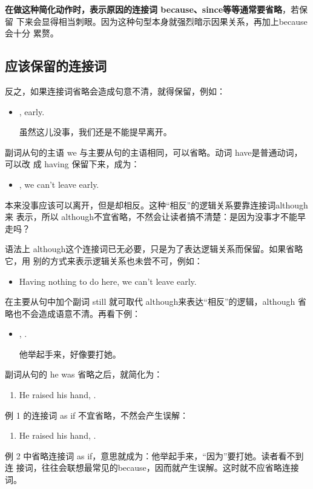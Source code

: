 \textbf{在做这种简化动作时，表示原因的连接词 because、since等等通常要省略}，若保留
下来会显得相当刺眼。因为这种句型本身就强烈暗示因果关系，再加上because 会十分
累赘。

\subsection{应该保留的连接词}

反之，如果连接词省略会造成句意不清，就得保留，例如：
\begin{itemize}
\item {},   early.

  虽然这儿没事，我们还是不能提早离开。
\end{itemize}
副词从句的主语 we 与主要从句的主语相同，可以省略。动词 have是普通动词，可以改
成 having 保留下来，成为：
\begin{itemize}
\item {}, we can't leave early.
\end{itemize}
本来没事应该可以离开，但是却相反。这种“相反”的逻辑关系要靠连接词although 来
表示，所以 although不宜省略，不然会让读者搞不清楚：是因为没事才不能早走吗？

语法上 although这个连接词已无必要，只是为了表达逻辑关系而保留。如果省略它，用
别的方式来表示逻辑关系也未尝不可，例如：
\begin{itemize}
\item Having nothing to do here, we  can't leave early.
\end{itemize}
在主要从句中加个副词 still 就可取代 although来表达“相反”的逻辑，although 省
略也不会造成语意不清。再看下例：
\begin{itemize}
\item {}  , .

  他举起手来，好像要打她。
\end{itemize}
副词从句的 he was 省略之后，就简化为：
\begin{enumerate}
\item He raised his hand, .
\end{enumerate}

例 1 的连接词 as if 不宜省略，不然会产生误解：
\begin{enumerate}[resume]
\item He raised his hand, .
\end{enumerate}
例 2 中省略连接词 as if，意思就成为：他举起手来，“因为”要打她。读者看不到连
接词，往往会联想最常见的because，因而就产生误解。这时就不应省略连接词。

